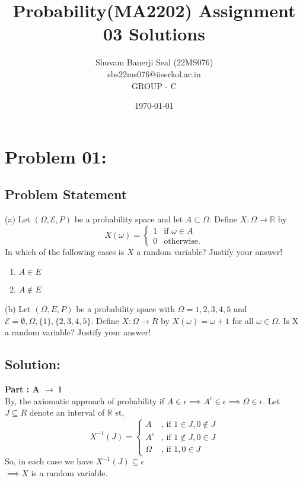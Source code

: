 \documentclass{article}
\title{Probability(MA2202) Assignment 03 Solutions}
\author{Shuvam Banerji Seal (22MS076)\\ \small sbs22ms076@iiserkol.ac.in \\ GROUP - C}
\date{\today} %
\theoremstyle{definition}
\begin{document}
\maketitle

\section{Problem 01:}
\begin{mdframed}[style = MyFrame]
\subsection{Problem Statement}
    
(a) Let $(\Omega, \mathcal{E}, P)$ be a probability space and let $A \subset \Omega$. Define $X : \Omega \to \mathbb{R}$ by
\[
X(\omega) = 
    \begin{cases} 
        1 & \text{if } \omega \in A \\
        0 & \text{otherwise}.
    \end{cases}
\]
In which of the following cases is $X$ a random variable? Justify your answer!
\begin{enumerate}
    \item $A \in E$
    \item $A\notin E$
\end{enumerate}

(b) Let $(\Omega, E, P)$ be a probability space with $\Omega = {1,2,3,4,5}$ and $\mathcal E = {\emptyset,\Omega,\lbrace 1\rbrace,\lbrace 2,3,4,5\rbrace}$. Define $X : \Omega \to R$ by
$X(\omega) = \omega + 1$ for all $\omega \in \Omega$. Is X a random variable? Justify your answer!

\end{mdframed}

\subsection{Solution:}
\textbf{Part : A $\to$ i}\\
By, the axiomatic approach of probability if $A \in \epsilon \implies A^c \in \epsilon \implies \Omega \in \epsilon$. Let $J \subseteq R$ denote an interval of $\mathbb R$ st,\\
\[
X^{-1}(J) = 
    \begin{cases} 
        A & \text{, if } 1 \in J, 0 \notin J \\
        A^c & \text{, if } 1 \notin J, 0 \in J \\
        \Omega & \text{, if } 1,0 \in J 
    \end{cases}
\]
So, in each case we have $X^{-1}(J) \subseteq \epsilon$\\
$\implies X$ is a random variable. 
\end{document}
